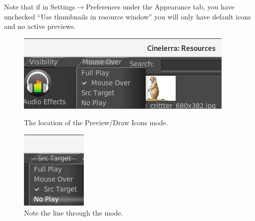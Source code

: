 Note that if in Settings$\rightarrow$Preferences under the Appearance tab, you have unchecked “Use thumbnails in resource window” you will only have default icons and no active previews.

\begin{figure}[htpb]
    \begin{minipage}{.69\linewidth}
        \centering
        \includegraphics[width=0.99\linewidth]{images/preview_icon_mode.png}
        \caption{The location of the Preview/Draw Icons mode.}
        \label{fig:preview_icon_mode}
    \end{minipage}
    \hfill
    \begin{minipage}{.29\linewidth}
        \vspace{2ex}
        \centering
        \includegraphics[width=0.7\linewidth]{images/line_through_mode.png}
        \caption{Note the line through the mode.}
        \label{fig:line_through_mode}
    \end{minipage}
\end{figure}



